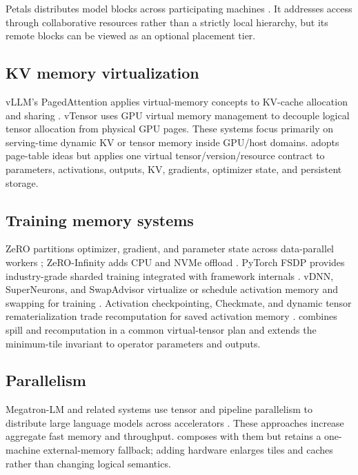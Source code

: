 Petals distributes model blocks across participating machines \cite{borzunov2022petals}. It addresses access through collaborative resources rather than a strictly local hierarchy, but its remote blocks can be viewed as an optional placement tier.

\subsection{KV memory virtualization}

vLLM's PagedAttention applies virtual-memory concepts to KV-cache allocation and sharing \cite{kwon2023pagedattention}. vTensor uses GPU virtual memory management to decouple logical tensor allocation from physical GPU pages. These systems focus primarily on serving-time dynamic KV or tensor memory inside GPU/host domains. \AMS adopts page-table ideas but applies one virtual tensor/version/resource contract to parameters, activations, outputs, KV, gradients, optimizer state, and persistent storage.

\subsection{Training memory systems}

ZeRO partitions optimizer, gradient, and parameter state across data-parallel workers \cite{rajbhandari2020zero}; ZeRO-Infinity adds CPU and NVMe offload \cite{rajbhandari2021zeroinfinity}. PyTorch FSDP provides industry-grade sharded training integrated with framework internals \cite{zhao2023fsdp}. vDNN, SuperNeurons, and SwapAdvisor virtualize or schedule activation memory and swapping for training \cite{rhu2016vdnn,wang2018superneurons,huang2020swapadvisor}. Activation checkpointing, Checkmate, and dynamic tensor rematerialization trade recomputation for saved activation memory \cite{chen2016sublinear,jain2019checkmate,kirisame2020dtr}. \AMS combines spill and recomputation in a common virtual-tensor plan and extends the minimum-tile invariant to operator parameters and outputs.

\subsection{Parallelism}

Megatron-LM and related systems use tensor and pipeline parallelism to distribute large language models across accelerators \cite{shoeybi2019megatron,narayanan2021efficient}. These approaches increase aggregate fast memory and throughput. \AMS composes with them but retains a one-machine external-memory fallback; adding hardware enlarges tiles and caches rather than changing logical semantics.

